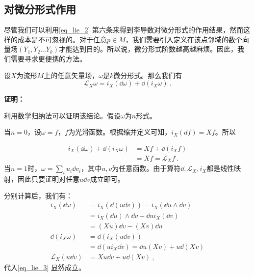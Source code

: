 \subsection{对微分形式作用}
尽管我们可以利用\autoref{eq_lie_2} 第六条来得到李导数对微分形式的作用结果，然而这样的成本是不可忽视的。对于任意$p\in M$，我们需要引入定义在该点邻域的数个向量场$(Y_1,Y_2...Y_k)$才能达到目的。所以说，微分形式阶数越高越麻烦。因此，我们需要寻求更便携的方法。
\begin{theorem}{}
设$X$为流形$M$上的任意矢量场，$\omega$是$k$微分形式。那么我们有
\begin{equation}\label{eq_lie_3}
\mathcal L_X\omega=i_X(\dd \omega)+\dd(i_X\omega)~.
\end{equation}
\end{theorem}
\textbf{证明：}

利用数学归纳法可以证明该结论。假设$\omega$为$n$形式。

当$n=0$，设$\omega=f$，$f$为光滑函数。根据缩并定义可知，$i_X(df)=Xf$。所以

\begin{equation}
\begin{aligned}
i_X(\dd \omega)+\dd(i_X\omega)&=Xf+\dd(i_Xf)\\
&=Xf=\mathcal L_Xf~.
\end{aligned}
\end{equation}
当$n=1$时，$\omega=\sum_i u_i\dd v_i$，其中$u,v$为任意函数。由于算符$\dd,\mathcal L_X,i_X$都是线性映射，因此只要证明对任意$u\dd v$成立即可。

分别计算后，我们有：
\begin{equation}
\begin{aligned}
i_X(\dd \omega)&=i_X(\dd (u\dd v))=i_X(\dd u\wedge\dd v)\\
&=i_X(\dd u)\wedge\dd v-\dd ui_X(\dd v)\\
&=(Xu)\dd v-(Xv)\dd u\\
\dd (i_X\omega)&=\dd(i_X(u\dd v))\\
&=\dd (ui_X\dd v)=\dd u(Xv)+u\dd(Xv)\\
\mathcal L_X(u\dd v)&=Xu\dd v+u\dd (Xv)~,
\end{aligned}
\end{equation}
代入\autoref{eq_lie_3} 显然成立。

